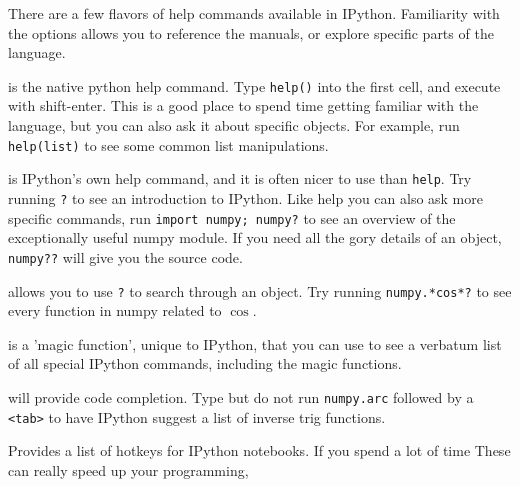 \documentclass[justified]{tufte-handout}
\begin{document}
\smallskip
\noindent
There are a few flavors of help commands available in IPython. Familiarity with
the options allows you to reference the manuals, or explore specific parts of
the language.  
\\
\begin{description}[font=\tt, leftmargin=0cm]
\item[help()] is the native python help command. Type \texttt{help()} into the
  first cell, and execute with shift-enter. This is a good place to spend time
  getting familiar with the language, but you can also ask it about specific
  objects. For example, run \texttt{help(list)} to see some common list
  manipulations.
\item[?] is IPython's own help command, and it is often nicer to use than
  \texttt{help}. Try running \texttt{?} to see an introduction to IPython. Like
  help you can also ask more specific commands, run \texttt{import numpy;
    numpy?} to see an overview of the exceptionally useful numpy module. If you
  need all the gory details of an object, \texttt{numpy??} will give you the
  source code.
\item[<regex>?] allows you to use \texttt{?} to search through an object. Try
  running \texttt{numpy.*cos*?} to see every function in numpy related to
  $\cos$.
\item[\%quickref] is a 'magic function', unique to IPython, that you can use to
  see a verbatum list of all special IPython commands, including the magic
  functions.
\item[<tab>] will provide code completion. Type but do not run
  \texttt{numpy.arc} followed by a \texttt{<tab>} to have IPython suggest a list
  of inverse trig functions.
\item[Control-m h] Provides a list of hotkeys for IPython notebooks. If you
  spend a lot of time These can
  really speed up your programming,
\end{description}

\pagebreak
\end{document}

